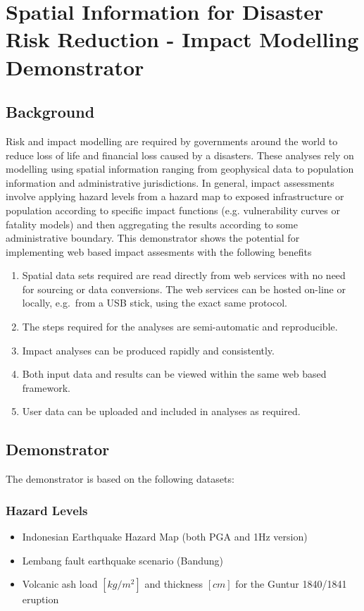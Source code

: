\documentclass[a4paper]{article}
\begin{document}
\section*{Spatial Information for Disaster Risk Reduction - Impact Modelling Demonstrator}

\subsection*{Background}

Risk and impact modelling are required by governments around the world to reduce loss of life and financial loss caused by a disasters. These analyses rely on modelling using spatial information ranging from geophysical data to population information and administrative jurisdictions.
In general, impact assessments involve applying hazard levels from a hazard map to exposed infrastructure or population according to specific impact functions (e.g. vulnerability curves or fatality models) and then aggregating the results according to some administrative boundary. 
This demonstrator shows the potential for implementing web based impact assesments with the following benefits
\begin{enumerate}
  \item Spatial data sets required are read directly from web services with no need for sourcing or data conversions. The web services can be hosted on-line or locally, e.g.\ from a USB stick, using the exact same protocol.
  \item The steps required for the analyses are semi-automatic and reproducible.
  \item Impact analyses can be produced rapidly and consistently.
  \item Both input data and results can be viewed within the same web based framework.
  \item User data can be uploaded and included in analyses as required.
\end{enumerate} 


\subsection*{Demonstrator}

The demonstrator is based on the following datasets:
\subsubsection*{Hazard Levels}
\begin{itemize} 
  \item Indonesian Earthquake Hazard Map (both PGA and 1Hz version)
  \item Lembang fault earthquake scenario (Bandung)
  \item Volcanic ash load $[kg/m^2]$ and thickness $[cm]$ for the Guntur 1840/1841 eruption 
\end{itemize}   
  
\end{document}
